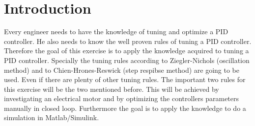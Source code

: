 \section{Introduction}

Every  engineer  needs  to  have  the knowledge of tuning and optimize  a  PID
controller.  He  also  needs  to know the well proven rules of  tuning  a  PID
controller. Therefore the  goal  of  this  exercise  is to apply the knowledge
acquired  to tuning a PID controller. Specially the tuning rules according  to
Ziegler-Nichols  (oscillation   method)   and  to  Chien-Hrones-Reswick  (step
respibse method) are going to be  used.  Even  if  there  are  plenty of other
tuning  rules.  The important two rules for this  exercise  will  be  the  two
mentioned before. This  will  be achieved by investigating an electrical motor
and  by  optimizing  the  controllers  parameters  manually  in  closed  loop.
Furthermore the goal  is  to  apply  the  knowledge  to  do  a  simulation  in
Matlab/Simulink.

